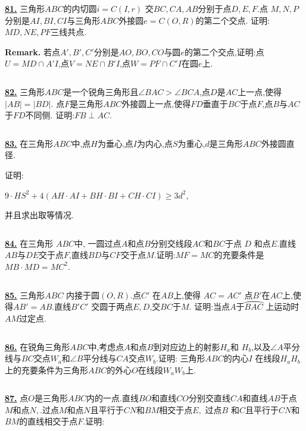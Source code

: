 \documentclass{article}
\begin{document}
$$ $$

\href{ http://www.artofproblemsolving.com/Forum/viewtopic.php?p=361066#p361066
}{\bf 81.}  三角形$ABC$的内切圆$i=C(I,r)$ 交$BC,CA,AB$分别于点$D,E,F$.点 $M,N,P$分别是$AI,BI,CI$与三角形$ABC$外接圆$e=C(O,R)$的第二个交点. 证明:$MD,NE,PF$三线共点.

{\bf Remark.}  若点$A',B',C'$分别是$AO,BO,CO$与圆$e$的第二个交点,证明:点$U= MD\cap A'I$,点$V=NE\cap B'I$,点$W=PF\cap C'I$在圆$e$上.


$$ $$

\href{ http://www.artofproblemsolving.com/Forum/viewtopic.php?p=331636#p331636
}{\bf 82.} 三角形$ABC$是一个锐角三角形且$\angle BAC>\angle BCA$,点$D$是$AC$上一点,使得$|AB|=|BD|$. 点$F$是三角形$ABC$外接圆上一点,使得$FD$垂直于$BC$于点$F$,点$B$与$AC$于$FD$不同侧.
证明:$FB\perp AC.$


$$ $$

\href{ http://www.artofproblemsolving.com/Forum/viewtopic.php?p=245463#p245463
}{\bf 83.}  在三角形$ABC$中,点$H$为垂心,点$I$为内心,点$S$为重心,$d$是三角形$ABC$外接圆直径.

证明:

$9\cdot HS^2+4\left(AH\cdot AI+BH\cdot BI+CH\cdot CI\right)\geq 3d^2$,

并且求出取等情况.


$$ $$

\href{ http://www.artofproblemsolving.com/Forum/viewtopic.php?p=336205#p336205
}{\bf 84.} 在三角形 $ABC$中, 一圆过点$A$和点$B$分别交线段$AC$和$BC$于点 $D$ 和点$E$.直线$AB$与$DE$交于点$F$,直线$BD$与$CF$交于点$M$.证明:$MF = MC$的充要条件是$MB\cdot MD = MC^2$.


$$ $$

\href{http://www.artofproblemsolving.com/Forum/viewtopic.php?p=329277#p329277
 }{\bf 85.} 三角形$ABC$ 内接于圆$(O,R)$.点$C'$ 在$AB$上,使得 $AC=AC'$ 点$B'$在$AC$上,使得$AB'=AB$.直线$B'C'$ 交圆于两点$E,D$,交$BC$于$M$.
证明:当点$A$于$\wideparen {BAC}$ 上运动时$AM$过定点.

$$ $$


\href{http://www.artofproblemsolving.com/Forum/viewtopic.php?p=320049#p320049
 }{\bf 86.} 在锐角三角形$ABC$中,考虑点$A$和点$B$到对应边上的射影$H_a$和 $H_b$,以及$\angle A$平分线与$BC$交点$W_a$和$\angle B$平分线与$CA$交点$W_b$.证明: 三角形$ABC$的内心$I$ 在线段$H_aH_b$上的充要条件为三角形$ABC$的外心$O$在线段$W_aW_b$上.


$$ $$

\href{ http://www.artofproblemsolving.com/Forum/viewtopic.php?p=316789#p316789
}{\bf 87.} 点$O$是三角形$ABC$内的一点.直线$BO$和直线$CO$分别交直线$CA$和直线$AB$于点$M$和点$N,$.过点$M$和点$ N$且平行于$CN$和$BM$相交于点$E,$ 过点$B$ 和$C$且平行于$CN$和$BM$的直线相交于点$F.$证明:
\end{document}
